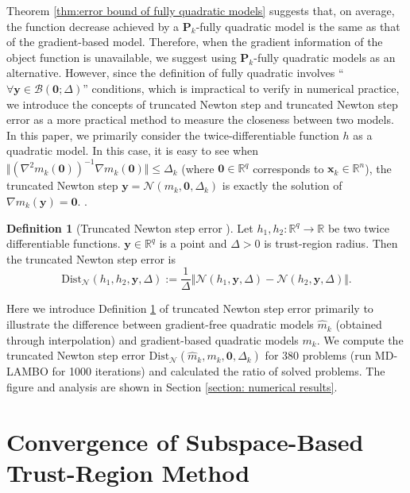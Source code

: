 \documentclass[colorlinks=true, linkcolor=blue, citecolor=blue, urlcolor=blue]{article}
\theoremstyle{plain}
\theoremstyle{definition}
\newtheorem{definition}[theorem]{Definition}
\theoremstyle{remark}
\newcommand{\RR}{\mathbb{R}}
\begin{document}
Theorem \ref{thm:error bound of fully quadratic models} suggests that, on average, the function decrease achieved by a $\bm P_k$-fully quadratic model is the same as that of the gradient-based model. Therefore, when the gradient information of the object function is unavailable, we suggest using $\bm P_k$-fully quadratic models as an alternative. However, since the definition of fully quadratic involves {\color{black}``$\forall \bm y\in \mathcal{B}(\bm 0;\Delta)$''} conditions, which is impractical to verify in numerical practice, we introduce the concepts of truncated Newton step \cite{xie2025remuregionalminimalupdating} and truncated Newton step error as a more practical method to measure the closeness between two models.
In this paper, we primarily consider the twice-differentiable function $h$ as a quadratic model. In this case, it is easy to see when $\Vert(\nabla^2m_k(\bm 0))^{-1}\nabla m_k(\bm 0)\Vert\leq \Delta_k$ (where $\bm 0\in\RR^q$ corresponds to $\bm x_k\in\RR^n$), the truncated Newton step $\bm y=\mathcal{N}(m_k,\bm 0,\Delta_k)$ is exactly the solution of $\nabla m_k(\bm y)=\bm 0$. \cite{xie2025remuregionalminimalupdating}.
\begin{definition}[Truncated Newton step error \cite{xie2025remuregionalminimalupdating}]\label{def: truncated newton step error}
Let $h_1,h_2:\RR^q\to \RR$ be two twice differentiable functions. $\bm y\in\RR^q$ is a point and $\Delta>0$ is trust-region radius. Then the truncated Newton step error is 
\begin{equation*}
    \mathrm{Dist}_{\mathcal{N}}(h_1,h_2,\bm y,\Delta):=\frac{1}{\Delta}\Vert\mathcal{N}(h_1,\bm y,\Delta)-\mathcal{N}(h_2,\bm y,\Delta)\Vert.   
\end{equation*}
\end{definition}
Here we introduce Definition \ref{def: truncated newton step error} of truncated Newton step error primarily to illustrate the difference between gradient-free quadratic models $\hat{m}_k$ (obtained through interpolation) and gradient-based quadratic models $m_k$. We compute the truncated Newton step error $\mathrm{Dist}_{\mathcal{N}}(\hat{m}_k,m_k,\bm 0,\Delta_k)$ for 380 problems (run MD-LAMBO for 1000 iterations) and calculated the ratio of solved problems. The figure and analysis are shown in Section \ref{section: numerical results}. 



\section{Convergence of Subspace-Based Trust-Region Method}\label{section: convergence}
\end{document}
